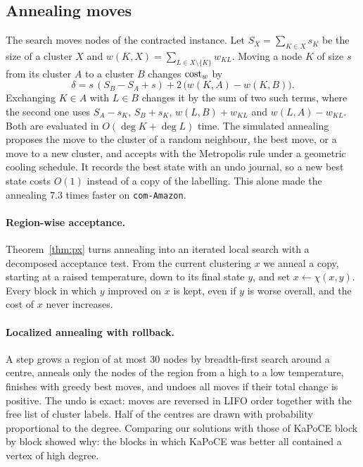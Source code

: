 \subsection{Annealing moves}

The search moves nodes of the contracted instance.  Let $S_X=\sum_{K\in X}s_K$
be the size of a cluster $X$ and $w(K,X)=\sum_{L\in X\setminus\{K\}}w_{KL}$.
Moving a node $K$ of size $s$ from its cluster $A$ to a cluster $B$ changes
$\mathrm{cost}_w$ by
\begin{equation}\label{eq:move}
\delta=s\,(S_B-S_A+s)+2\,\bigl(w(K,A)-w(K,B)\bigr).
\end{equation}
Exchanging $K\in A$ with $L\in B$ changes it by the sum of two such terms,
where the second one uses $S_A-s_K$, $S_B+s_K$, $w(L,B)+w_{KL}$ and
$w(L,A)-w_{KL}$.  Both are evaluated in $O(\deg K+\deg L)$ time.  The
simulated annealing~\citep{KirkpatrickGV83} proposes the move to the cluster
of a random neighbour, the best move, or a move to a new cluster, and accepts
with the Metropolis rule under a geometric cooling schedule.  It records the
best state with an undo journal, so a new best state costs $O(1)$ instead of
a copy of the labelling.  This alone made the annealing $7.3$ times faster on
\texttt{com-Amazon}.

\paragraph{Region-wise acceptance.}  Theorem~\ref{thm:px} turns annealing into
an iterated local search with a decomposed acceptance test.  From the current
clustering $x$ we anneal a copy, starting at a raised temperature, down to its
final state $y$, and set $x\gets\chi(x,y)$.  Every block in which $y$ improved
on $x$ is kept, even if $y$ is worse overall, and the cost of $x$ never
increases.

\paragraph{Localized annealing with rollback.}  A step grows a region of at
most $30$ nodes by breadth-first search around a centre, anneals only the
nodes of the region from a high to a low temperature, finishes with greedy best
moves, and undoes all moves if their total change is positive.  The undo is
exact: moves are reversed in LIFO order together with the free list of
cluster labels.  Half of the centres are drawn with probability proportional to
the degree.  Comparing our solutions with those of KaPoCE block by block showed
why: the blocks in which KaPoCE was better all contained a vertex of high
degree.

